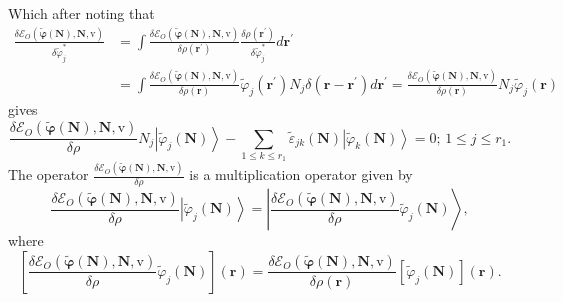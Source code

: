 \documentclass[aps,preprint]{revtex4}%
\begin{document}
Which after noting that
\begin{align}
\frac{\delta\mathcal{E}_{O}\left(  \boldsymbol{\tilde{\varphi}}\left(
\boldsymbol{N}\right)  ,\boldsymbol{N,}\mathrm{v}\right)  }{\delta
\tilde{\varphi}_{j}^{\ast}}  &  =\int\frac{\delta\mathcal{E}_{O}\left(
\boldsymbol{\tilde{\varphi}}\left(  \boldsymbol{N}\right)  ,\boldsymbol{N,}%
\mathrm{v}\right)  }{\delta\rho\left(  \boldsymbol{r}^{\prime}\right)  }%
\frac{\delta\rho\left(  \boldsymbol{r}^{\prime}\right)  }{\delta\tilde
{\varphi}_{j}^{\ast}}d\boldsymbol{r}^{\prime}\nonumber\\
&  =\int\frac{\delta\mathcal{E}_{O}\left(  \boldsymbol{\tilde{\varphi}}\left(
\boldsymbol{N}\right)  ,\boldsymbol{N,}\mathrm{v}\right)  }{\delta\rho\left(
\boldsymbol{r}\right)  }\tilde{\varphi}_{j}\left(  \boldsymbol{r}^{\prime
}\right)  N_{j}\delta\left(  \boldsymbol{r-r}^{\prime}\right)  d\boldsymbol{r}%
^{\prime}=\frac{\delta\mathcal{E}_{O}\left(  \boldsymbol{\tilde{\varphi}%
}\left(  \boldsymbol{N}\right)  ,\boldsymbol{N,}\mathrm{v}\right)  }%
{\delta\rho\left(  \boldsymbol{r}\right)  }N_{j}\tilde{\varphi}_{j}\left(
\boldsymbol{r}\right)
\end{align}
gives%
\begin{equation}
\frac{\delta\mathcal{E}_{O}\left(  \boldsymbol{\tilde{\varphi}}\left(
\boldsymbol{N}\right)  ,\boldsymbol{N,}\mathrm{v}\right)  }{\delta\rho}%
N_{j}\left\vert \tilde{\varphi}_{j}\left(  \boldsymbol{N}\right)
\right\rangle -\sum_{1\leq k\leq r_{1}}\tilde{\varepsilon}_{jk}\left(
\boldsymbol{N}\right)  \left\vert \tilde{\varphi}_{k}\left(  \boldsymbol{N}%
\right)  \right\rangle =0;\,1\leq j\leq r_{1}.
\end{equation}
The operator $\frac{\delta\mathcal{E}_{O}\left(  \boldsymbol{\tilde{\varphi}%
}\left(  \boldsymbol{N}\right)  ,\boldsymbol{N,}\mathrm{v}\right)  }%
{\delta\rho}$ is a multiplication operator given by
\begin{equation}
\frac{\delta\mathcal{E}_{O}\left(  \boldsymbol{\tilde{\varphi}}\left(
\boldsymbol{N}\right)  ,\boldsymbol{N,}\mathrm{v}\right)  }{\delta\rho
}\left\vert \tilde{\varphi}_{j}\left(  \boldsymbol{N}\right)  \right\rangle
=\left\vert \frac{\delta\mathcal{E}_{O}\left(  \boldsymbol{\tilde{\varphi}%
}\left(  \boldsymbol{N}\right)  ,\boldsymbol{N,}\mathrm{v}\right)  }%
{\delta\rho}\tilde{\varphi}_{j}\left(  \boldsymbol{N}\right)  \right\rangle ,
\end{equation}
where
\begin{equation}
\left[  \frac{\delta\mathcal{E}_{O}\left(  \boldsymbol{\tilde{\varphi}}\left(
\boldsymbol{N}\right)  ,\boldsymbol{N,}\mathrm{v}\right)  }{\delta\rho}%
\tilde{\varphi}_{j}\left(  \boldsymbol{N}\right)  \right]  \left(
\boldsymbol{r}\right)  =\frac{\delta\mathcal{E}_{O}\left(  \boldsymbol{\tilde
{\varphi}}\left(  \boldsymbol{N}\right)  ,\boldsymbol{N,}\mathrm{v}\right)
}{\delta\rho\left(  \boldsymbol{r}\right)  }\left[  \tilde{\varphi}_{j}\left(
\boldsymbol{N}\right)  \right]  \left(  \boldsymbol{r}\right)  .
\end{equation}
\end{document}
